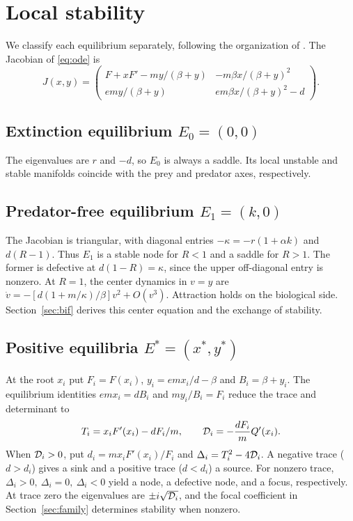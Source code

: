 \section{Local stability}\label{sec:local}
We classify each equilibrium separately, following the organization of \citet[Section~3.2]{haque11}. The Jacobian of \eqref{eq:ode} is
\begin{equation}\label{eq:jac}
 J(x,y)=\begin{pmatrix}
 F+xF'-my/(\beta+y)&-m\beta x/(\beta+y)^2\\
 emy/(\beta+y)&em\beta x/(\beta+y)^2-d
 \end{pmatrix}.
\end{equation}

\subsection{Extinction equilibrium \texorpdfstring{\(E_0=(0,0)\)}{E0}}
The eigenvalues are \(r\) and \(-d\), so \(E_0\) is always a saddle. Its local unstable and stable manifolds coincide with the prey and predator axes, respectively.

\subsection{Predator-free equilibrium \texorpdfstring{\(E_1=(k,0)\)}{E1}}
The Jacobian is triangular, with diagonal entries \(-\kappa=-r(1+\alpha k)\) and \(d(R-1)\). Thus \(E_1\) is a stable node for \(R<1\) and a saddle for \(R>1\). The former is defective at \(d(1-R)=\kappa\), since the upper off-diagonal entry is nonzero. At \(R=1\), the center dynamics in \(v=y\) are
\(\dot v=-[d(1+m/\kappa)/\beta]v^2+O(v^3)\). Attraction holds on the biological side. Section~\ref{sec:bif} derives this center equation and the exchange of stability.

\subsection{Positive equilibria \texorpdfstring{\(E^*=(x^*,y^*)\)}{E*}}\label{sec:singlelocal}
At the root \(x_i\) put \(F_i=F(x_i)\), \(y_i=emx_i/d-\beta\) and \(B_i=\beta+y_i\). The equilibrium identities \(emx_i=dB_i\) and \(my_i/B_i=F_i\) reduce the trace and determinant to
\begin{equation}\label{eq:TD}
 T_i=x_iF'(x_i)-dF_i/m,\qquad
 \mathcal D_i=-\frac{dF_i}{m}Q'(x_i).
\end{equation}
When \(\mathcal D_i>0\), put \(d_i=mx_iF'(x_i)/F_i\) and \(\Delta_i=T_i^2-4\mathcal D_i\). A negative trace (\(d>d_i\)) gives a sink and a positive trace (\(d<d_i\)) a source. For nonzero trace, \(\Delta_i>0,\ \Delta_i=0,\ \Delta_i<0\) yield a node, a defective node, and a focus, respectively. At trace zero the eigenvalues are \(\pm i\sqrt{\mathcal D_i}\), and the focal coefficient in Section~\ref{sec:family} determines stability when nonzero.

